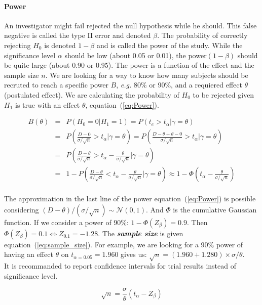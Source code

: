 \documentclass[final, paper=letter,5p,times,twocolumn]{elsarticle}
\theoremstyle{definition}
\begin{document}
\paragraph{Power}{An investigator might fail rejected the null hypothesis while he should. This false negative is called the type II error and denoted $\beta$. The probability of correctly rejecting $H_{0}$ is denoted $1-\beta$ and is called the power of the study. While the significance level $\alpha$ should be low (about 0.05 or 0.01), the power$(1-\beta)$ should be quite large (about 0.90 or 0.95). The power is a function of the effect and the sample size $n$. We are looking for a way to know how many subjects should be recruted to reach a specific power $B$, {\it e.g.} 80\% or 90\%, and a requiered effect $\theta$ (postulated effect). We are calculating the probability of $H_{0}$ to be rejected given $H_{1}$ is true with an effect $\theta$, equation~(\ref{eq:Power}). 

  \begin{equation}
    \begin{array}{rcl}
      B(\theta) & = & P\left( H_{0} = 0 | H_{1} = 1 \right)  = P\left( t_{e} > t_{\alpha} | \gamma = \theta \right) \\
      & = & P\left( \frac{D - 0}{\sigma / \sqrt{n}} > t_{\alpha} | \gamma = \theta \right) = P\left( \frac{D - \theta + \theta - 0}{\sigma / \sqrt{n}} > t_{\alpha} | \gamma = \theta \right) \\
      & = & P\left( \frac{D - \theta}{\sigma / \sqrt{n}} > t_{\alpha} - \frac{\theta}{\sigma / \sqrt{n}} | \gamma = \theta \right) \\
      & = & 1 - P\left( \frac{D - \theta}{\sigma / \sqrt{n}} < t_{\alpha} - \frac{\theta}{\sigma / \sqrt{n}} | \gamma = \theta \right) \approx 1 - \Phi \left( t_{\alpha} - \frac{\theta}{\sigma / \sqrt{n}} \right)\\
    \end{array}
    \label{eq:Power}
  \end{equation}

  The approximation in the last line of the power equation~(\ref{eq:Power}) is possible considering $(D - \theta) / (\sigma / \sqrt{n}) \sim \mathcal{N}(0,1)$. And $\Phi$ is the cumulative Gaussian function. If we consider a power of 90\%: $1 - \Phi(Z_{\beta}) = 0.9$. Then $\Phi(Z_{\beta}) = 0.1 \Leftrightarrow Z_{0.1} = -1.28$. The {\bf \it sample size} is given equation~(\ref{eq:sample_size}). For example, we are looking for a 90\% power of having an effect $\theta$ on $t_{\alpha = 0.05} = 1.960$ gives us: $\sqrt{n} = (1.960+1.280) \times \sigma / \theta$. \\
  It is recommanded to report confidence intervals for trial results instead of significance level.

  \begin{equation}
    \sqrt{n} = \frac{\sigma}{\theta} (t_{\alpha} - Z_{\beta})
    \label{eq:sample_size}
  \end{equation}
}
\end{document}
